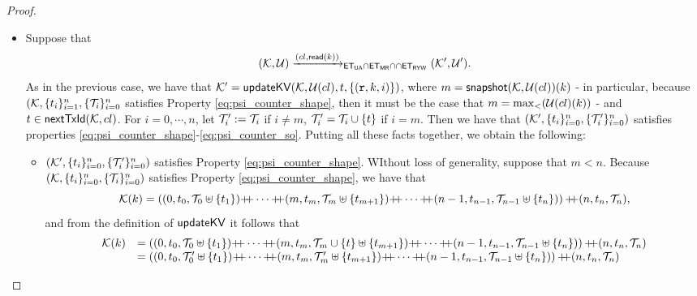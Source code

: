 \begin{proof}
\begin{itemize}
\item Suppose that 
\[
(\mathcal{K}, \mathcal{U}) \xrightarrow{({cl}, \mathsf{read}(k))}_{\mathsf{ET}_{\mathsf{UA}} \cap \mathsf{ET}_{\mathsf{MR}} \cap \cap \mathsf{ET}_{\mathsf{RYW}}} (\mathcal{K}', \mathcal{U}').
\]
As in the previous case, we have that $\mathcal{K}' = \mathsf{updateKV}(\mathcal{K}, \mathcal{U}({cl}), t, \{(\textnormal{\texttt r}, k, i)\})$, where 
$m = \mathsf{snapshot}(\mathcal{K}, \mathcal{U}({cl}))(k)$  - 
in particular, because $(\mathcal{K}, \{t_{i}\}_{i=1}^{n}, \{\mathcal{T}_{i}\}_{i=0}^{n}$ satisfies 
Property \eqref{eq:psi_counter_shape}, then it must be the case that $m = \max_{<}(\mathcal{U}({cl})(k))$ - 
and $t \in \mathsf{nextTxId}(\mathcal{K}, {cl})$. 
For $i=0,\cdots, n$, let $\mathcal{T}'_{i} := \mathcal{T}_{i}$ if $i \neq m$, $\mathcal{T}'_{i} = \mathcal{T}_{i} \cup \{t\}$ if 
$i = m$. Then we have that $(\mathcal{K}', \{t_{i}\}_{i=0}^{n}, \{\mathcal{T}'_{i}\}_{i=0}^{n})$ satisfies 
properties \eqref{eq:psi_counter_shape}-\eqref{eq:psi_counter_so}.
Putting all these facts together, we obtain the following: 
\begin{itemize}
\item $(\mathcal{K}', \{t_{i}\}_{i=0}^{n}, \{\mathcal{T}'_{i}\}_{i=0}^{n})$ satisfies Property \eqref{eq:psi_counter_shape}. 
WIthout loss of generality, suppose that $m < n$. 
Because $(\mathcal{K},  \{t_{i}\}_{i=0}^{n}, \{\mathcal{T}_{i}\}_{i=0}^{n})$ satisfies Property \eqref{eq:psi_counter_shape}, 
we have that 
\[
\hh(\ke) = \left( (0, \txid_{0}, \T_{0} \uplus \{\txid_1\}) \lcat \cdots \lcat (m, \txid_{m}, \T_{m} \uplus \{\txid_{m+1}\}) 
\lcat \cdots \lcat (n-1, \txid_{n-1}, \T_{n-1} \uplus \{\txid_{n}\}) \right) \lcat (n, \txid_{n}, \T_{n}),
\] 
and from the definition of $\mathsf{updateKV}$ it follows that 
\[
\begin{array}{ll}
\hh(\ke) &= \left( (0, \txid_{0}, \T_{0} \uplus \{\txid_1\}) \lcat \cdots \lcat (m, \txid_{m}, \T_{m} \cup \{\txid\} \uplus \{\txid_{m+1}\}) 
\lcat \cdots \lcat (n-1, \txid_{n-1}, \T_{n-1} \uplus \{\txid_{n}\}) \right) \lcat (n, \txid_{n}, \T_{n}) \\
& = \left( (0, \txid_{0}, \T'_{0} \uplus \{\txid_1\}) \lcat \cdots \lcat (m, \txid_{m}, \T'_{m} \uplus \{\txid_{m+1}\}) 
\lcat \cdots \lcat (n-1, \txid_{n-1}, \T_{n-1} \uplus \{\txid_{n}\}) \right) \lcat (n, \txid_{n}, \T_{n})
\end{array}
\]

\end{itemize}
\end{itemize}
\end{proof}
